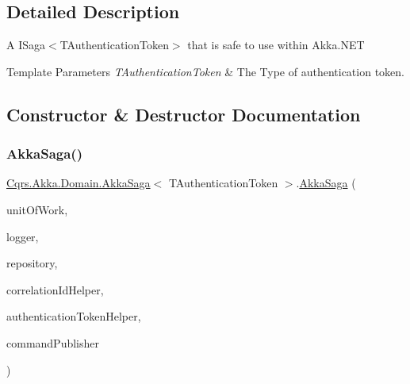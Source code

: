 \subsection{Detailed Description}
A I\+Saga$<$\+T\+Authentication\+Token$>$ that is safe to use within Akka.\+N\+ET 


\begin{DoxyTemplParams}{Template Parameters}
{\em T\+Authentication\+Token} & The Type of authentication token.\\
\hline
\end{DoxyTemplParams}


\subsection{Constructor \& Destructor Documentation}
\mbox{\label{classCqrs_1_1Akka_1_1Domain_1_1AkkaSaga_a2f0ebb5d1d22e3112d5b9a09fde7fb47_a2f0ebb5d1d22e3112d5b9a09fde7fb47}} 
\subsubsection{\texorpdfstring{Akka\+Saga()}{AkkaSaga()}}
{\footnotesize\ttfamily \hyperlink{classCqrs_1_1Akka_1_1Domain_1_1AkkaSaga}{Cqrs.\+Akka.\+Domain.\+Akka\+Saga}$<$ T\+Authentication\+Token $>$.\hyperlink{classCqrs_1_1Akka_1_1Domain_1_1AkkaSaga}{Akka\+Saga} (\begin{DoxyParamCaption}\item[{\hyperlink{interfaceCqrs_1_1Domain_1_1ISagaUnitOfWork}{I\+Saga\+Unit\+Of\+Work}$<$ T\+Authentication\+Token $>$}]{unit\+Of\+Work,  }\item[{I\+Logger}]{logger,  }\item[{\hyperlink{interfaceCqrs_1_1Akka_1_1Domain_1_1IAkkaSagaRepository}{I\+Akka\+Saga\+Repository}$<$ T\+Authentication\+Token $>$}]{repository,  }\item[{I\+Correlation\+Id\+Helper}]{correlation\+Id\+Helper,  }\item[{\hyperlink{interfaceCqrs_1_1Authentication_1_1IAuthenticationTokenHelper}{I\+Authentication\+Token\+Helper}$<$ T\+Authentication\+Token $>$}]{authentication\+Token\+Helper,  }\item[{\hyperlink{interfaceCqrs_1_1Commands_1_1ICommandPublisher}{I\+Command\+Publisher}$<$ T\+Authentication\+Token $>$}]{command\+Publisher }\end{DoxyParamCaption})\hspace{0.3cm}{\ttfamily [protected]}}



